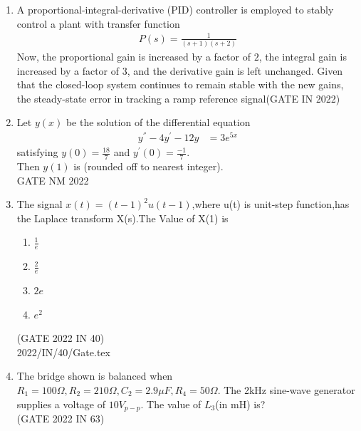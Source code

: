 \begin{enumerate}[label=\thechapter.\arabic*,ref=\thechapter.\theenumi]
\item A proportional-integral-derivative (PID) controller is employed to stably control a
plant with transfer function
\begin{align}
    P(s) = \frac{1}{(s+1)(s+2)}
\end{align}
Now, the proportional gain is increased by a factor of $2$, the integral gain is
increased by a factor of $3$, and the derivative gain is left unchanged. Given that the closed-loop system continues to remain stable with the new gains, the steady-state
error in tracking a ramp reference signal\hfill(GATE IN 2022) \\
\solution

\newpage
\item  Let $y(x)$ be the solution of the differential equation 
\begin{align}
y^{''} - 4y^{'} -12y &= 3e^{5x} 
 \label{eq:ishitha.g22.nm.50.1.eq}
\end{align}
satisfying $y(0)=\frac{18}{7}$ and $y^{'}(0)=\frac{-1}{7}$. \\
Then $y(1)$ is \underline{\hspace{2.5cm}}  (rounded off to nearest integer).  \\    \hfill{GATE NM 2022 } \\
\solution

\newpage

\item The signal $x(t)=(t-1)^2u(t-1)$,where u(t) is unit-step function,has the Laplace transform X(s).The Value of X(1) is 
\begin{enumerate}
    \item $\frac{1}{e}$
    \item $\frac{2}{e}$
    \item $2e$
    \item $e^2$
\end{enumerate}
\hfill{(GATE 2022 IN 40)}\\
\solution
 {2022/IN/40/Gate.tex}
\pagebreak

\item The bridge shown is balanced when $R_1 = 100\Omega, R_2 = 210\Omega, C_2 = 2.9\mu F, R_4 = 50\Omega$. The 2kHz sine-wave generator supplies a voltage of $10 V_{p-p}$. The value of $L_3$(in mH) is?
\\
\hfill(GATE 2022 IN 63)
\solution

\pagebreak


\end{enumerate}
